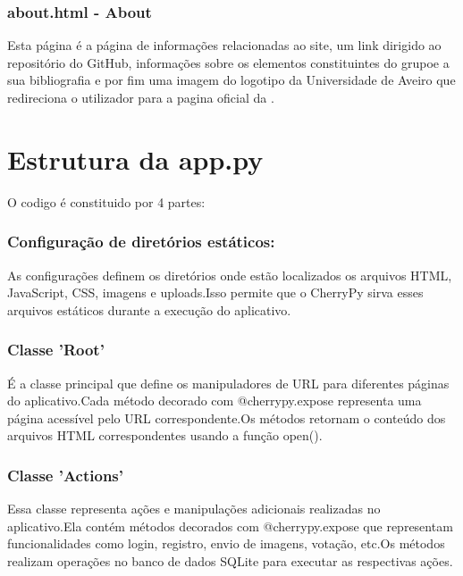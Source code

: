 \documentclass{report}
\begin{document}
\subsubsection{about.html - About}

\indent Esta página é a página de informações relacionadas ao site, um link dirigido ao repositório do GitHub, informações sobre os elementos constituintes do grupoe a sua bibliografia e por fim uma imagem do logotipo da Universidade de Aveiro que redireciona o utilizador para a pagina oficial da .\\

\section {Estrutura da app.py}

\indent O codigo é constituido por 4 partes:

\subsubsection{Configuração de diretórios estáticos:}

\indent As configurações definem os diretórios onde estão localizados os arquivos HTML, JavaScript, CSS, imagens e uploads.Isso permite que o CherryPy sirva esses arquivos estáticos durante a execução do aplicativo.\\

\subsubsection{Classe 'Root'}

\indent É a classe principal que define os manipuladores de URL para diferentes páginas do aplicativo.Cada método decorado com @cherrypy.expose representa uma página acessível pelo URL correspondente.Os métodos retornam o conteúdo dos arquivos HTML correspondentes usando a função open().\\

\subsubsection{Classe 'Actions'}

\indent Essa classe representa ações e manipulações adicionais realizadas no aplicativo.Ela contém métodos decorados com @cherrypy.expose que representam funcionalidades como login, registro, envio de imagens, votação, etc.Os métodos realizam operações no banco de dados SQLite para executar as respectivas ações.\\
\end{document}
